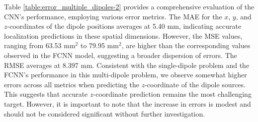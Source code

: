 \documentclass[a4paper, UKenglish, 11pt]{uiomaster}
\begin{document}
Table \ref{table:error_multiple_dipoles-2} provides a comprehensive evaluation of the CNN's performance, employing various error metrics. The MAE for the $x$, $y$, and $z$-coordinates of the dipole positions averages at 5.40 mm, indicating accurate localization predictions in these spatial dimensions. However, the MSE values, ranging from 63.53 mm$^2$ to 79.95 mm$^2$, are higher than the corresponding values observed in the FCNN model, suggesting a broader dispersion of errors. The RMSE averages at 8.397 mm. Consistent with the single-dipole problem and the FCNN's performance in this multi-dipole problem, we observe somewhat higher errors across all metrics when predicting the $z$-coordinate of the dipole sources. This suggests that accurate $z$-coordinate prediction remains the most challenging target. However, it is important to note that the increase in errors is modest and should not be considered significant without further investigation.
\end{document}
